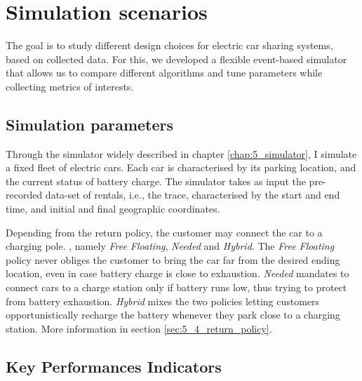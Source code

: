 \section{Simulation scenarios }
\label{sec:7_4_modelling}

The goal is to study different design choices for electric car sharing systems, based on collected data. For this, we developed a flexible event-based simulator that allows us to compare different algorithms and tune  parameters while collecting metrics of interests.

\subsection{Simulation parameters}

Through the simulator widely described in chapter \ref{chap:5_simulator}, I simulate a fixed fleet of electric cars. Each car is characterised by its parking location, and the current status of battery charge. 
The simulator takes as input the pre-recorded data-set of rentals, i.e., the trace, characterised by the start and end time, and initial and final geographic coordinates.

Depending from the return policy, the customer may connect the car to a charging pole. , namely \textit{Free Floating}, \textit{Needed} and \textit{Hybrid}. The \textit{Free Floating} policy never obliges the customer to bring the car far from the desired ending location, even in case battery charge is close to exhaustion. \textit{Needed} mandates to connect cars to a charge station only if battery runs low, thus trying to protect from battery exhaustion. \textit{Hybrid} mixes the two policies letting customers opportunistically recharge the battery whenever they park close to a charging station. More information in section \ref{sec:5_4_return_policy}.




\subsection{Key Performances Indicators}
\label{sec:7_4_metrics}


